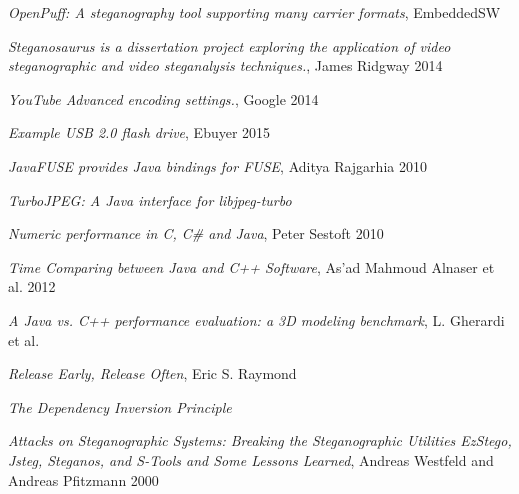 \documentclass[paper=a4, fontsize=11pt,twoside]{scrartcl}
\numberwithin{table}{section}
\numberwithin{figure}{section}
\numberwithin{algorithm}{section}
\begin{document}
\begin{thebibliography}{1}
 \emph{OpenPuff: A steganography tool supporting many carrier formats}, EmbeddedSW\\

 \emph{Steganosaurus is a dissertation project exploring the application of video steganographic and video steganalysis techniques.}, James Ridgway 2014\\

 \emph{YouTube Advanced encoding settings.}, Google 2014\\

 \emph{Example USB 2.0 flash drive}, Ebuyer 2015\\

 \emph{JavaFUSE provides Java bindings for FUSE}, Aditya Rajgarhia 2010\\

 \emph{TurboJPEG: A Java interface for libjpeg-turbo}\\

 \emph{Numeric performance in C, C\# and Java}, Peter Sestoft 2010\\
 
 \emph{Time Comparing between Java and C++ Software}, As’ad Mahmoud Alnaser et al. 2012\\
 
 \emph{A Java vs. C++ performance evaluation: a 3D modeling benchmark}, L. Gherardi et al.\\

 \emph{Release Early, Release Often}, Eric S. Raymond \\

 \emph{The Dependency Inversion Principle}\\

 \emph{Attacks on Steganographic Systems: Breaking the Steganographic Utilities EzStego, Jsteg, Steganos, and S-Tools and Some Lessons Learned}, Andreas Westfeld and Andreas Pfitzmann 2000


\end{thebibliography}
\end{document}
